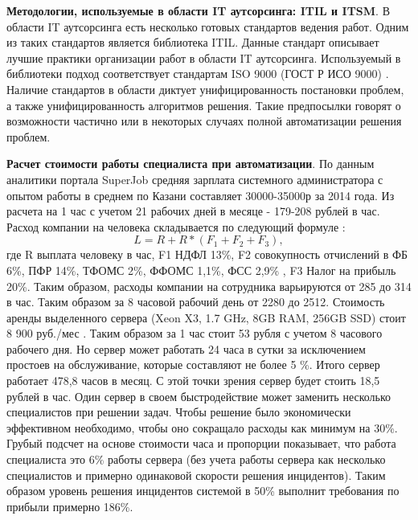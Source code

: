 \textbf{Методологии, используемые в области IT аутсорсинга: ITIL и ITSM}. 
В области IT аутсорсинга есть несколько готовых стандартов ведения работ. Одним из таких стандартов является библиотека ITIL. Данные стандарт описывает лучшие практики организации работ в области IT аутсорсинга. Используемый в библиотеки подход соответствует стандартам ISO 9000 (ГОСТ Р ИСО 9000) \cite{ITIL1} \cite{ITIL2} \cite{ITIL3}.
Наличие стандартов в области диктует унифицированность постановки проблем, а также унифицированность алгоритмов решения. Такие предпосылки говорят о возможности частично или в некоторых случаях полной автоматизации решения проблем.\\  \par

\textbf{Расчет стоимости работы специалиста при автоматизации}.
По данным аналитики портала SuperJob \cite{SuperJob} средняя зарплата системного администратора с опытом работы в среднем по Казани составляет 30000-35000р за 2014 года. Из расчета на 1 час с учетом 21 рабочих дней в месяце - 179-208 рублей в час. Расход компании на человека складывается по следующий формуле \cite{FiscalCodecs}:
\[
L = R + R*(F_1 +F_2+F_3),
\]
где R выплата человеку в час, F1 НДФЛ 13\%, F2 совокупность отчислений в ФБ 6\%, ПФР 14\%, ТФОМС 2\%, ФФОМС 1,1\%, ФСС 2,9\% , F3 Налог на прибыль 20\%. 
Таким образом, расходы компании на сотрудника варьируются от 285 до 314 в час. Таким образом за 8 часовой рабочий день от 2280 до 2512. Стоимость аренды выделенного сервера (Xeon X3, 1.7 GHz, 8GB RAM, 256GB SSD) стоит 8 900 руб./мес \cite{TimeWeb}. Таким образом за 1 час стоит 53 рубля с учетом 8 часового рабочего дня. Но сервер может работать 24 часа в сутки за исключением простоев на обслуживание, которые составляют не более 5 \%. Итого сервер работает 478,8 часов в месяц. С этой точки зрения сервер будет стоить 18,5 рублей в час. Один сервер в своем быстродействие может заменить несколько специалистов при решении задач. Чтобы решение было экономически эффективном необходимо, чтобы оно сокращало расходы как минимум на 30\%. Грубый подсчет на основе стоимости часа и пропорции показывает, что работа специалиста это 6\% работы сервера (без учета работы сервера как несколько специалистов и примерно одинаковой скорости решения инцидентов). Таким образом уровень решения инцидентов системой в 50\% выполнит требования по прибыли примерно 186\%. 


